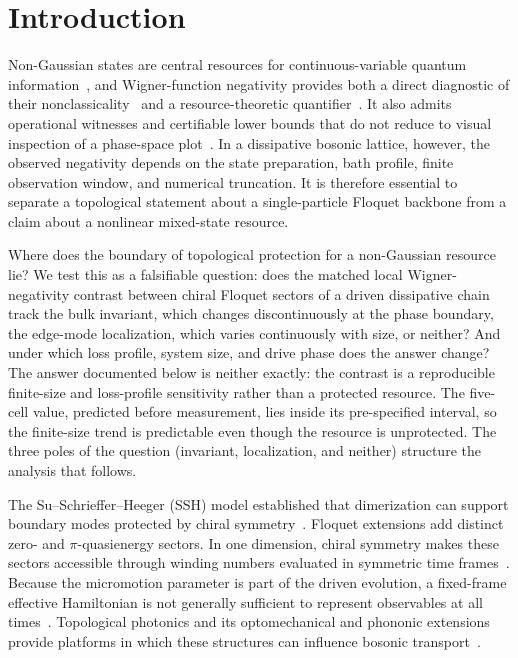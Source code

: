 \documentclass[aps,pra,preprint,superscriptaddress,amsmath,amssymb]{revtex4-2}
\begin{document}
\maketitle

\section{Introduction}
\label{sec:introduction}

Non-Gaussian states are central resources for continuous-variable quantum information~\cite{Weedbrook2012}, and Wigner-function negativity provides both a direct diagnostic of their nonclassicality~\cite{Hudson1974,Mari2012} and a resource-theoretic quantifier~\cite{Albarelli2018,Zhuang2018}. It also admits operational witnesses and certifiable lower bounds that do not reduce to visual inspection of a phase-space plot~\cite{Chabaud2021witnessingwigner,Zaw2024}. In a dissipative bosonic lattice, however, the observed negativity depends on the state preparation, bath profile, finite observation window, and numerical truncation. It is therefore essential to separate a topological statement about a single-particle Floquet backbone from a claim about a nonlinear mixed-state resource.

Where does the boundary of topological protection for a non-Gaussian resource lie? We test this as a falsifiable question: does the matched local Wigner-negativity contrast between chiral Floquet sectors of a driven dissipative chain track the bulk invariant, which changes discontinuously at the phase boundary, the edge-mode localization, which varies continuously with size, or neither? And under which loss profile, system size, and drive phase does the answer change? The answer documented below is neither exactly: the contrast is a reproducible finite-size and loss-profile sensitivity rather than a protected resource. The five-cell value, predicted before measurement, lies inside its pre-specified interval, so the finite-size trend is predictable even though the resource is unprotected. The three poles of the question (invariant, localization, and neither) structure the analysis that follows.

The Su--Schrieffer--Heeger (SSH) model established that dimerization can support boundary modes protected by chiral symmetry~\cite{Su1979}. Floquet extensions add distinct zero- and $\pi$-quasienergy sectors. In one dimension, chiral symmetry makes these sectors accessible through winding numbers evaluated in symmetric time frames~\cite{Asboth2014}. Because the micromotion parameter is part of the driven evolution, a fixed-frame effective Hamiltonian is not generally sufficient to represent observables at all times~\cite{Xu2022micromotion}. Topological photonics and its optomechanical and phononic extensions provide platforms in which these structures can influence bosonic transport~\cite{Ozawa2019,Rudner2013,Xuereb2014,Peano2015,Peano2016}.
\end{document}
